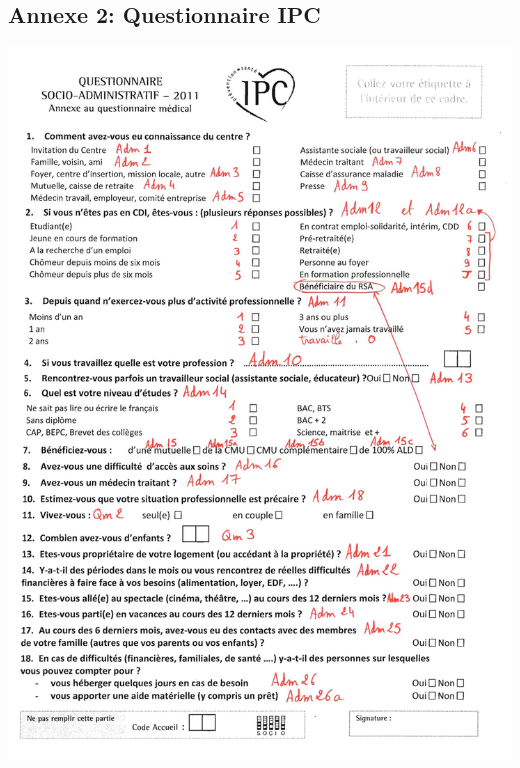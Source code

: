 \documentclass{book}
\begin{document}
\subsection{Annexe 2: Questionnaire IPC}
\includegraphics[scale=.25]{quest_ipc-1.png}
\newpage
\end{document}
